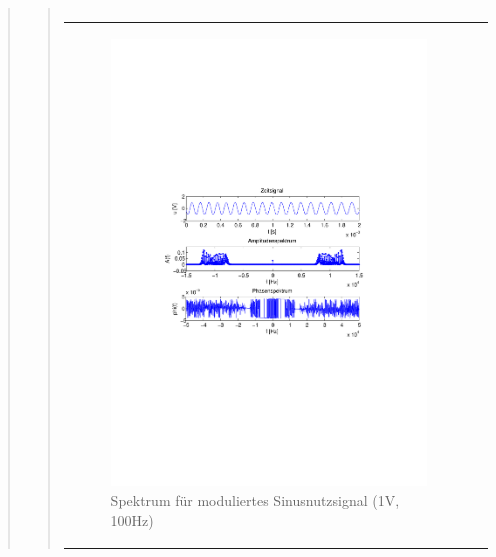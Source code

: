 \begin{quote}
\begin{quote}
\begin{center}
\begin{tabular}{ll}
            \end{tabular}
            \end{center}
        	
        	   
        	       \begin{center}
            \begin{tabular}{ll}

            \hspace{-14em}
                \begin{minipage}{0.6\textwidth}

                    \begin{figure}[H]
                        \label{fig:}
                        \includegraphics[scale=0.5, trim = 2cm 6.5cm 1.5cm
                        8.5cm, clip]{./Bilder/sin_a1_f100}
                        \caption{Spektrum für moduliertes Sinusnutzsignal (1V,
                        100Hz)}
                    \end{figure}


\end{minipage}
\end{tabular}
\end{center}
\end{quote}
\end{quote}
